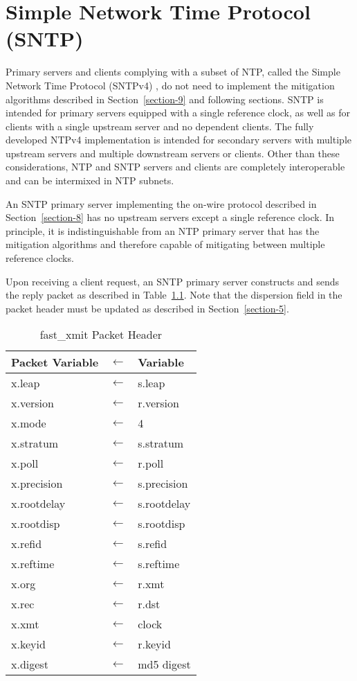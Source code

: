\chapter{Simple Network Time Protocol (SNTP)}
\label{section-14}

Primary servers and clients complying with a subset of NTP, called
the Simple Network Time Protocol (SNTPv4) \cite{RFC4330}, do not need to
implement the mitigation algorithms described in Section~\ref{section-9} and
following sections. SNTP is intended for primary servers equipped
with a single reference clock, as well as for clients with a single
upstream server and no dependent clients. The fully developed NTPv4
implementation is intended for secondary servers with multiple
upstream servers and multiple downstream servers or clients. Other
than these considerations, NTP and SNTP servers and clients are
completely interoperable and can be intermixed in NTP subnets.

An SNTP primary server implementing the on-wire protocol described in
Section~\ref{section-8} has no upstream servers except a single reference clock.
In principle, it is indistinguishable from an NTP primary server that
has the mitigation algorithms and therefore capable of mitigating
between multiple reference clocks.

Upon receiving a client request, an SNTP primary server constructs
and sends the reply packet as described in Table~\ref{fast_xmit_packet_header}. Note that the
dispersion field in the packet header must be updated as described in
Section~\ref{section-5}.

\begin{table}[htb]
\center
\begin{tabular}{| l c l |}
\hline
Packet Variable & $ \leftarrow $ & Variable \\
\hline
\hline
x.leap      & $ \leftarrow $ & s.leap      \\
x.version   & $ \leftarrow $ & r.version   \\
x.mode      & $ \leftarrow $ & 4           \\
x.stratum   & $ \leftarrow $ & s.stratum   \\
x.poll      & $ \leftarrow $ & r.poll      \\
x.precision & $ \leftarrow $ & s.precision \\
x.rootdelay & $ \leftarrow $ & s.rootdelay \\
x.rootdisp  & $ \leftarrow $ & s.rootdisp  \\
x.refid     & $ \leftarrow $ & s.refid     \\
x.reftime   & $ \leftarrow $ & s.reftime   \\
x.org       & $ \leftarrow $ & r.xmt       \\
x.rec       & $ \leftarrow $ & r.dst       \\
x.xmt       & $ \leftarrow $ & clock       \\
x.keyid     & $ \leftarrow $ & r.keyid     \\
x.digest    & $ \leftarrow $ & md5 digest  \\
\hline
\end{tabular}
\caption{fast\_xmit Packet Header}
\label{fast_xmit_packet_header}
\end{table}

